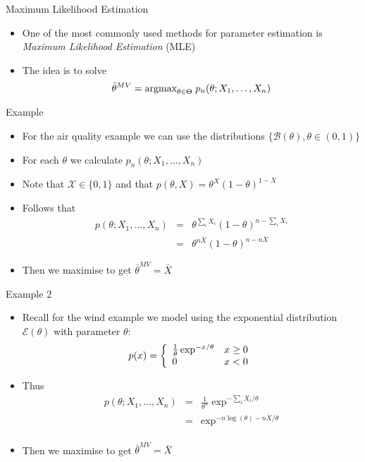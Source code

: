 \documentclass{beamer}
\begin{document}
\begin{frame}{Maximum Likelihood Estimation} 
\begin{itemize} 
 \item One of the most commonly used methods for parameter estimation is \emph{Maximum Likelihood Estimation} (MLE) 
 \item The idea is to solve 
 \begin{displaymath}
  \bar{\theta}^{MV} = \mbox{argmax}_{\theta \in \Theta} \; p_n(\theta; X_1, \ldots, X_n) 
 \end{displaymath}
\end{itemize}
\end{frame}

\begin{frame}{Example} 
\begin{itemize} 
 \item For the air quality example we can use the distributions $\{\mathcal{B}(\theta), \theta \in (0, 1)\}$ 
 \item For each $\theta$ we calculate $p_n(\theta; X_1, \ldots, X_n)$
 \item Note that $\mathcal{X} \in \{0, 1\}$ and that $p(\theta, X) = \theta^X(1-\theta)^{1-X}$  
 \item Follows that 
 \begin{eqnarray*} 
  p(\theta; X_1, \ldots, X_n) &=& \theta^{\sum_i X_i}(1-\theta)^{n-{\sum_i X_i}} \\ 
  &=& \theta^{n \bar{X}}(1-\theta)^{n-{n \bar{X}}} 
 \end{eqnarray*}
 \item Then we maximise to get $\bar{\theta}^{MV} = \bar{X}$ 
\end{itemize}
\end{frame}

\begin{frame}{Example 2} 
\begin{itemize} 
 \item Recall for the wind example we model using the exponential distribution $\mathcal{E}(\theta)$ with parameter $\theta$: 
  \begin{displaymath}
  p(x) = \left\{ \begin{array}{l l}\frac{1}{\theta}  \exp^{-x/\theta} & x \geq 0 \\ 0 & x < 0 \end{array} \right. 
 \end{displaymath}
 \item Thus
  \begin{eqnarray*} 
  p(\theta; X_1, \ldots, X_n) &=& \frac{1}{\theta^n}  \exp^{-\sum_i X_i/\theta} \\ 
  &=&  \exp^{-n\log(\theta) - n\bar{X}/\theta} \\ 
 \end{eqnarray*}
 \item Then we maximise to get $\bar{\theta}^{MV} = \bar{X}$ 
\end{itemize}
\end{frame}
\end{document}
